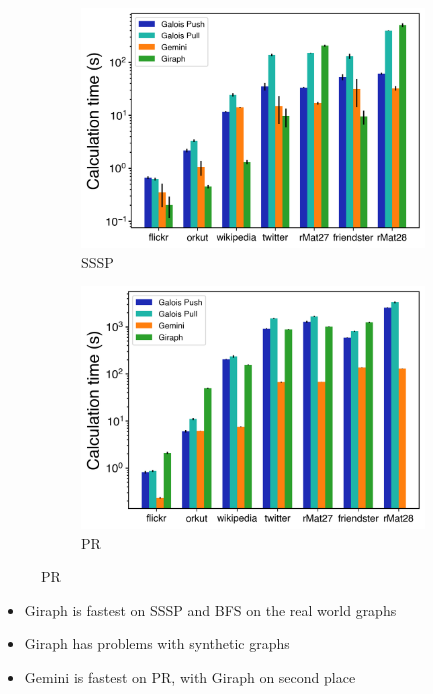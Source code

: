 \documentclass{meetings}
\begin{document}
\begin{figure}[h]
	\begin{subfigure}{0.45\textwidth}
		\includegraphics[width=\linewidth]{../../plots/distributedSSSP_calcTime.png}
		\caption{SSSP}
	\end{subfigure}
	\hfil
	\begin{subfigure}{0.45\textwidth}
		\includegraphics[width=\linewidth]{../../plots/distributedPR_calcTime.png}
		\caption{PR}
	\end{subfigure}
\end{figure}
\begin{itemize}
	\item Giraph is fastest on SSSP and BFS on the real world graphs
	\item Giraph has problems with synthetic graphs
	\item Gemini is fastest on PR, with Giraph on second place
\end{itemize}
\end{document}

